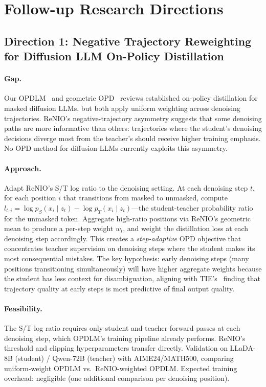 \documentclass[11pt,a4paper]{article}
\begin{document}
\section{Follow-up Research Directions}

\subsection{Direction 1: Negative Trajectory Reweighting for Diffusion LLM On-Policy Distillation}

\paragraph{Gap.} Our OPDLM~\cite{ye2026opdlm} and geometric OPD~\cite{shen2026geometry} reviews established on-policy distillation for masked diffusion LLMs, but both apply uniform weighting across denoising trajectories. ReNIO's negative-trajectory asymmetry suggests that some denoising paths are more informative than others: trajectories where the student's denoising decisions diverge most from the teacher's should receive higher training emphasis. No OPD method for diffusion LLMs currently exploits this asymmetry.

\paragraph{Approach.} Adapt ReNIO's S/T log ratio to the denoising setting. At each denoising step $t$, for each position $i$ that transitions from masked to unmasked, compute $l_{t,i} = \log p_S(x_i \mid z_t) - \log p_T(x_i \mid z_t)$---the student-teacher probability ratio for the unmasked token. Aggregate high-ratio positions via ReNIO's geometric mean to produce a per-step weight $w_t$, and weight the distillation loss at each denoising step accordingly. This creates a \emph{step-adaptive} OPD objective that concentrates teacher supervision on denoising steps where the student makes its most consequential mistakes. The key hypothesis: early denoising steps (many positions transitioning simultaneously) will have higher aggregate weights because the student has less context for disambiguation, aligning with TIE's~\cite{yun2026tie} finding that trajectory quality at early steps is most predictive of final output quality.

\paragraph{Feasibility.} The S/T log ratio requires only student and teacher forward passes at each denoising step, which OPDLM's training pipeline already performs. ReNIO's threshold and clipping hyperparameters transfer directly. Validation on LLaDA-8B (student) / Qwen-72B (teacher) with AIME24/MATH500, comparing uniform-weight OPDLM vs.\ ReNIO-weighted OPDLM. Expected training overhead: negligible (one additional comparison per denoising position).
\end{document}
